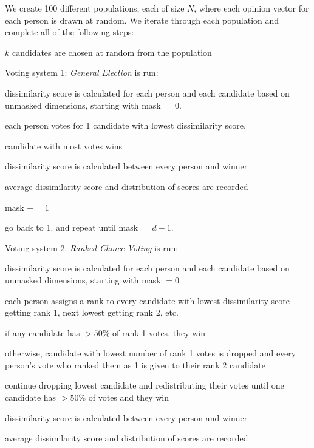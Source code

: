 
We create 100 different populations, each of size $N$, where each opinion vector for each person is drawn at random.
We iterate through each population and complete all of the following steps:
\begin{enum_tight}
\item $k$ candidates are chosen at random from the population
\item Voting system 1: {\it General Election} is run:
\begin{enum_tight}
\item dissimilarity score is calculated for each person and each candidate based on unmasked dimensions, starting with mask $=0$.
\item each person votes for 1 candidate with lowest dissimilarity score.
\item candidate with most votes wins
\item dissimilarity score is calculated between every person and winner
\item average dissimilarity score and distribution of scores are recorded
\item mask $+= 1$
\item go back to 1. and repeat until mask $= d-1$.
\end{enum_tight}
\item Voting system 2: {\it Ranked-Choice Voting} is run:
\begin{enum_tight}
\item dissimilarity score is calculated for each person and each candidate based on unmasked dimensions, starting with mask $=0$
\item each person assigns a rank to every candidate with lowest dissimilarity score getting rank 1, next lowest getting rank 2, etc.
\begin{enum_tight}
\item if any candidate has $> 50\%$ of rank 1 votes, they win
\item otherwise, candidate with lowest number of rank 1 votes is dropped and every person's vote who ranked them as 1 is given to their rank 2 candidate
\item continue dropping lowest candidate and redistributing their votes until one candidate has $> 50\%$ of votes and they win
\end{enum_tight}
\item dissimilarity score is calculated between every person and winner
\item average dissimilarity score and distribution of scores are recorded

\end{enum_tight}
\end{enum_tight}
